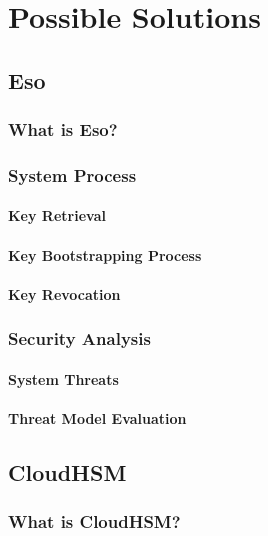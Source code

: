 \chapter{Possible Solutions}\label{C:solutionanalysis}
	
	\section{Eso}
		\subsection{What is Eso?}

		\subsection{System Process}

			\subsubsection{Key Retrieval}

			\subsubsection{Key Bootstrapping Process}

			\subsubsection{Key Revocation}

		\subsection{Security Analysis}

			\subsubsection{System Threats}

			\subsubsection{Threat Model Evaluation}

	\section{CloudHSM}
		\subsection{What is CloudHSM?}

